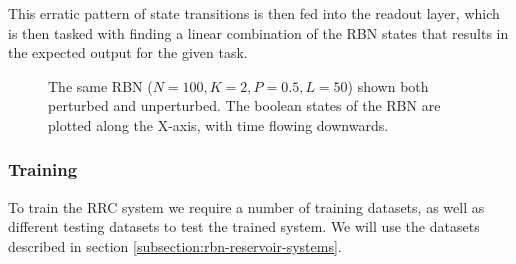 This erratic pattern of state transitions is then fed into the readout layer,
which is then tasked with finding a linear combination of the RBN states that results in the expected output for the given task.

\begin{figure}
  \caption{
    The same RBN ($N=100, K=2, P=0.5, L=50$) shown both perturbed and unperturbed.
    The boolean states of the RBN are plotted along the X-axis,
    with time flowing downwards.
  }
\end{figure}

\subsubsection{Training}

To train the RRC system we require a number of training datasets,
as well as different testing datasets to test the trained system.
We will use the datasets described in section \ref{subsection:rbn-reservoir-systems}.

